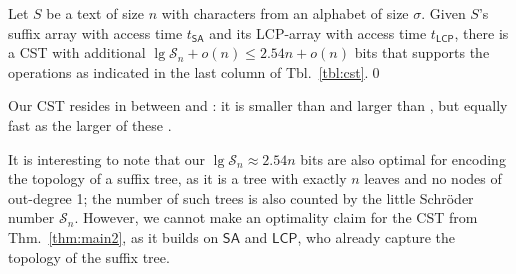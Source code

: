 \documentclass[11pt,onecolumn,final]{article} \usepackage{a4}
\newcommand{\supcat}{\mathcal{S}}
\newcommand{\LCP}[0]{\mathsf{LCP}}
\newcommand{\SUF}[0]{\mathsf{SA}}
\theoremstyle{plain}
\theoremstyle{remark}
\begin{document}
\begin{theorem}
  \label{thm:main2}
  Let $S$ be a text of size $n$ with characters from an alphabet of size $\sigma$. Given $S$'s suffix array with access time $t_\SUF$ and its LCP-array with access time $t_\LCP$, there is a CST with additional $\lg \supcat_n + o(n)\le 2.54n+o(n)$ bits that supports the operations as indicated in the last column of Tbl.~\ref{tbl:cst}.\hfill \qed
\end{theorem}

Our CST resides in between \cite{ohlebusch09compressed} and \cite{ohlebusch10cst++}: it is smaller than \cite{ohlebusch10cst++} and larger than \cite{ohlebusch09compressed}, but equally fast as the larger of these \cite{ohlebusch10cst++}.

It is interesting to note that our $\lg\supcat_n\approx 2.54n$ bits are also optimal for encoding the topology of a suffix tree, as it is a tree with exactly $n$ leaves and no nodes of out-degree 1; the number of such trees is also counted by the little Schr\"oder number $\supcat_n$. However, we cannot make an optimality claim for the CST from Thm.~\ref{thm:main2}, as it builds on $\SUF$ and $\LCP$, who already capture the topology of the suffix tree.



\end{document}
